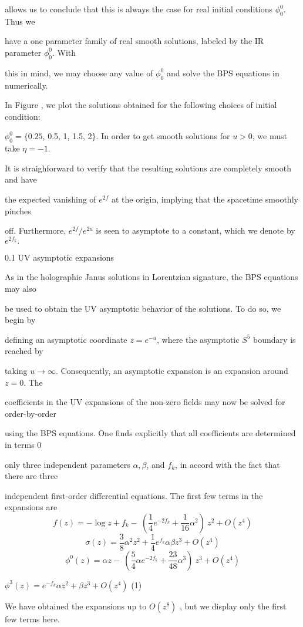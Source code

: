 \documentclass[a4paper,12pt]{article}
\begin{document}
allows us to conclude that this is always the case for real initial conditions $\phi_{0}^{0}$. Thus we

have a one parameter family of real smooth solutions, labeled by the IR parameter $\phi_{0}^{0}$. With

this in mind, we may choose any value of $\phi_{0}^{0}$ and solve the BPS equations in numerically.

In Figure , we plot the solutions obtained for the following choices of initial condition:

$\phi_{0}^{0}=\{0.25$, 0.5, 1, 1.5, 2$\}$. In order to get smooth solutions for $u>0$, we must take $\eta=-1.$

It is straighforward to verify that the resulting solutions are completely smooth and have

the expected vanishing of $e^{2f}$ at the origin, implying that the spacetime smoothly pinches

off. Furthermore, $e^{2f}/e^{2u}$ is seen to asymptote to a constant, which we denote by $e^{2f_{k}}.$

0.1 UV asymptotic expansions

As in the holographic Janus solutions in Lorentzian signature, the BPS equations may also

be used to obtain the UV asymptotic behavior of the solutions. To do so, we begin by

defining an asymptotic coordinate $z=e^{-u}$, where the asymptotic $S^{5}$ boundary is reached by

taking $ u\rightarrow\infty$. Consequently, an asymptotic expansion is an expansion around $z=0$. The

coefficients in the UV expansions of the non-zero fields may now be solved for order-by-order

using the BPS equations. One finds explicitly that all coefficients are determined in terms $0$

only three independent parameters $\alpha, \beta$, and $f_{k}$, in accord with the fact that there are three

independent first-order differential equations. The first few terms in the expansions are
$$
f(z)=-\log z+f_{k}-\ (\frac{1}{4}e^{-2f_{k}}+\frac{1}{16}\alpha^{2})\ z^{2}+O(z^{4})
$$
$$
\sigma(z)=\frac{3}{8}\alpha^{2}z^{2}+\frac{1}{4}e^{f_{k}}\alpha\beta z^{3}+O(z^{4})
$$
$$
\phi^{0}(z)=\alpha z-\ (\frac{5}{4}\alpha e^{-2f_{k}}+\frac{23}{48}\alpha^{3})\ z^{3}+O(z^{4})
$$
\begin{center}
$\phi^{3}(z)=e^{-f_{k}}\alpha z^{2}+\beta z^{3}+O(z^{4})$   (1)
\end{center}
We have obtained the expansions up to $O(z^{8})$ , but we display only the first few terms here.
\end{document}
